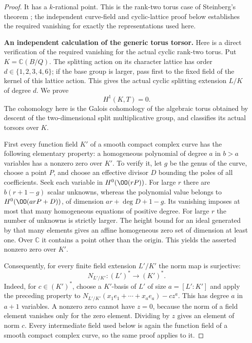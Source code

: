 \begin{proof}
It has a $k$-rational point. This is the
rank-two torus case of Steinberg's theorem
\cite[Theorem~1.9]{Steinberg1965}; the independent
curve-field and cyclic-lattice proof below
establishes the required vanishing for exactly
the representations used here.
\par\medskip\noindent\textbf{An independent calculation of the generic torus torsor.}
Here is a direct verification of the required vanishing
for the actual cyclic rank-two torus. Put
$K=\mathbb C(B/Q)$. The splitting action on its
character lattice has order $d\in\{1,2,3,4,6\}$;
if the base group is larger, pass first to the fixed
field of the kernel of this lattice action. This gives
the actual cyclic splitting extension $L/K$ of degree $d$.
We prove
\[
                         H^1(K,T)=0.                 \tag{C.EO.H1}\label{cdp:eq:C.EO.H1}
\]
The cohomology here is the Galois cohomology of the
algebraic torus obtained by descent of the two-dimensional
split multiplicative group, and classifies its actual
torsors over $K$.

First every function field $K'$ of a smooth compact
complex curve has the following elementary property:
a homogeneous polynomial of degree $a$ in $b>a$
variables has a nonzero zero over $K'$. To verify it,
let $g$ be the genus of the curve, choose a point $P$,
and choose an effective divisor $D$ bounding the poles
of all coefficients. Seek each variable in
$H^0(\OO(rP))$. For large $r$ there are
$b(r+1-g)$ scalar unknowns, whereas the polynomial
value belongs to $H^0(\OO(arP+D))$, of dimension
$ar+\deg D+1-g$. Its vanishing imposes at most that
many homogeneous equations of positive degree.
For large $r$ the number of unknowns is strictly
larger. The height bound for an ideal generated by
that many elements gives an affine homogeneous zero
set of dimension at least one. Over $\mathbb C$ it
contains a point other than the origin. This yields
the asserted nonzero zero over $K'$.

Consequently, for every finite field extension
$L'/K'$ the norm map is surjective:
\[
               N_{L'/K'}:(L')^*\longrightarrow(K')^*.
                                                               \tag{C.EO.H2}\label{cdp:eq:C.EO.H2}
\]
Indeed, for $c\in(K')^*$, choose a $K'$-basis of
$L'$ of size $a=[L':K']$ and apply the preceding
property to
$N_{L'/K'}(x_1e_1+\cdots+x_ae_a)-cz^a$.
This has degree $a$ in $a+1$ variables.
A nonzero zero cannot have $z=0$, because the norm
of a field element vanishes only for the zero element.
Dividing by $z$ gives an element of norm $c$.
Every intermediate field used below is again the
function field of a smooth compact complex curve,
so the same proof applies to it.


\end{proof}
